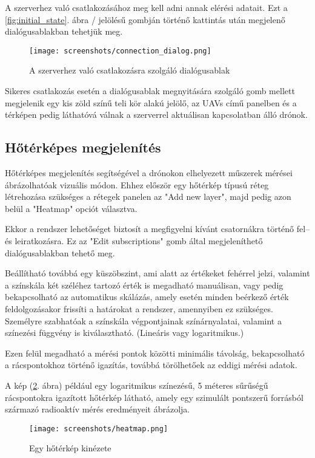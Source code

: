 A szerverhez való csatlakozásához meg kell adni annak elérési adatait. Ezt a
\ref{fig:initial_state}. ábra / jelölésű gombján történő kattintás
után megjelenő dialógusablakban tehetjük meg.

\begin{figure}[H]
  \center
  \texttt{[image: screenshots/connection\_dialog.png]}
  \caption{A szerverhez való csatlakozásra szolgáló dialógusablak}
  \label{fig:connection_dialog}
\end{figure}

Sikeres csatlakozás esetén a dialógusablak megnyitására szolgáló gomb mellett
megjelenik egy kis zöld színű teli kör alakú jelölő, az UAVs című panelben és a
térképen pedig láthatóvá válnak a szerverrel aktuálisan kapcsolatban álló
drónok.


\subsection{Hőtérképes megjelenítés}

Hőtérképes megjelenítés segítségével a drónokon elhelyezett műszerek mérései
ábrázolhatóak vizuális módon. Ehhez először egy hőtérkép típusú réteg
létrehozása szükséges a rétegek panelen az "Add new layer", majd pedig azon
belül a "Heatmap" opciót választva.

Ekkor a rendszer lehetőséget biztosít a megfigyelni kívánt csatornákra történő
fel-- és leiratkozásra. Ez az "Edit subscriptions" gomb által megjeleníthető
dialógusablakban tehető meg.

Beállítható továbbá egy küszöbszint, ami alatt az értékeket fehérrel jelzi,
valamint a színskála két széléhez tartozó érték is megadható manuálisan, vagy
pedig bekapcsolható az automatikus skálázás, amely esetén minden beérkező érték
feldolgozásakor frissíti a határokat a rendszer, amennyiben ez szükséges.
Személyre szabhatóak a színskála végpontjainak színárnyalatai, valamint a
színezési függvény is kiválasztható. (Lineáris vagy logaritmikus.)

Ezen felül megadható a mérési pontok közötti minimális távolság, bekapcsolható a
rácspontokhoz történő igazítás, továbbá törölhetőek az eddigi mérési adatok.

A kép (\ref{fig:heatmap}. ábra) például egy logaritmikus színezésű, 5 méteres
sűrűségű rácspontokra igazított hőtérkép látható, amely egy szimulált pontszerű
forrásból származó radioaktív mérés eredményeit ábrázolja.

\begin{figure}[H]
  \center
  \texttt{[image: screenshots/heatmap.png]}
  \caption{Egy hőtérkép kinézete}
  \label{fig:heatmap}
\end{figure}


